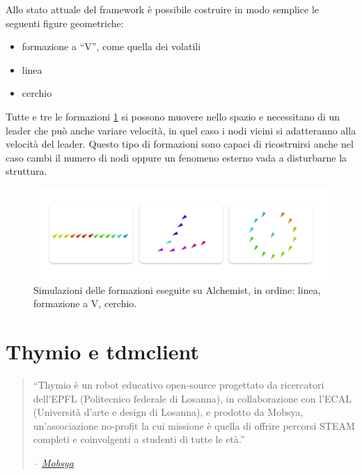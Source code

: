 \documentclass[12pt,a4paper,openright,twoside]{book}
\begin{document}
Allo stato attuale del framework è possibile costruire in modo semplice le seguenti figure geometriche:
\begin{itemize}
    \item formazione a ``V'', come quella dei volatili
    \item linea
    \item cerchio
\end{itemize}

Tutte e tre le formazioni \cref{fig:formation-simulations} \cite{Macroswarm} si possono muovere nello spazio e necessitano di un leader che può anche variare velocità, in quel caso i nodi vicini si adatteranno alla velocità del leader. Questo tipo di formazioni sono capaci di ricostruirsi anche nel caso cambi il numero di nodi oppure un fenomeno esterno vada a disturbarne la struttura.

\begin{figure}
    \centering
    \includegraphics[width=.9\linewidth]{figures/formation-simulations.pdf}
    \caption{Simulazioni delle formazioni eseguite su Alchemist, in ordine: linea, formazione a V, cerchio.}
    \label{fig:formation-simulations}
\end{figure}

\section{Thymio e tdmclient}

\begin{quote}
    \raggedright
    ``Thymio è un robot educativo open-source progettato da ricercatori dell'EPFL (Politecnico federale di Losanna), in collaborazione con l'ECAL (Università d'arte e design di Losanna), e prodotto da Mobsya, un'associazione no-profit la cui missione è quella di offrire percorsi STEAM completi e coinvolgenti a studenti di tutte le età.''
    \begin{flushright}
        \textit{-- \href{https://www.thymio.org/}{Mobsya}}
    \end{flushright}
\end{quote}
\end{document}
